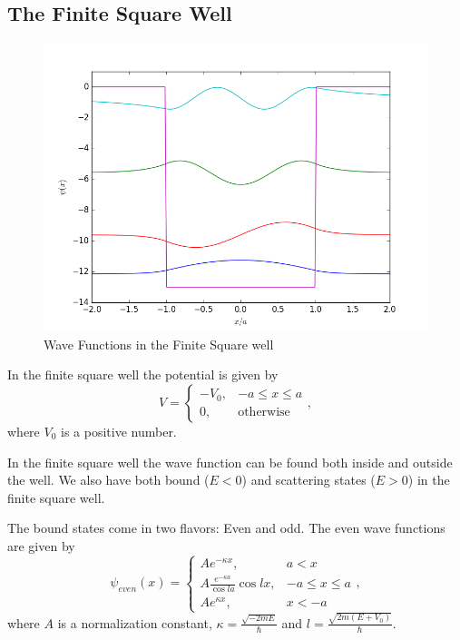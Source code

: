 \documentclass[12pt,a4paper]{article}
\begin{document}
\subsection{The Finite Square Well}
\begin{figure}
\includegraphics[width=\textwidth]{../Python/FSW_boundStates.png}
\caption{Wave Functions in the Finite Square well}
\label{fig:finiteSquareWell}
\end{figure}

In the finite square well the potential is given by
\begin{equation}
V = \begin{cases} -V_0, & -a \leq x \leq a \\
                  0, & \text{otherwise} \end{cases},
\end{equation}
where $V_0$ is a positive number.

In the finite square well the wave function can be found both inside and outside the well. We also have both bound ($E < 0$) and scattering states ($E > 0$) in the finite square well.

The bound states come in two flavors: Even and odd. The even wave functions are given by
\begin{equation}
\psi_{even} (x) = \begin{cases} A e^{- \kappa x}, & a < x \\
                                A \frac{e^{- \kappa a}}{\cos la} \cos l x, & -a \leq x \leq a \\
                                A e^{\kappa x}, & x < -a \end{cases},
\end{equation}
where $A$ is a normalization constant, $\kappa = \frac{\sqrt{-2 m E}}{\hbar}$ and $l = \frac{\sqrt{2 m (E + V_0)}}{\hbar}$.
\end{document}
